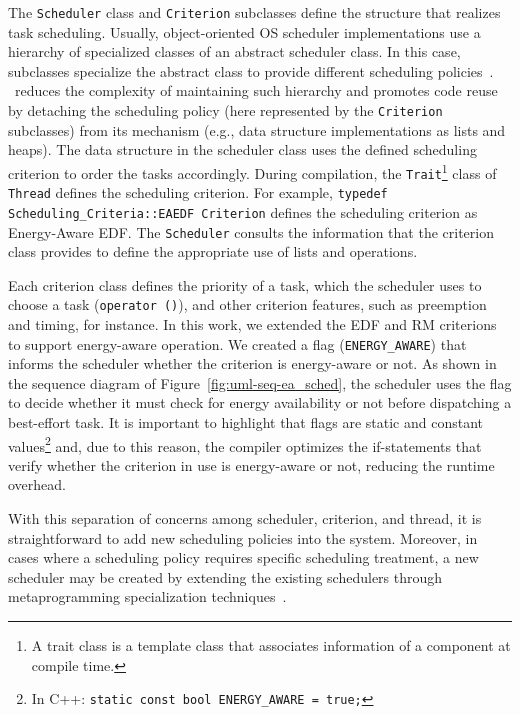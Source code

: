 
The \texttt{Scheduler} class and \texttt{Criterion} subclasses define the structure that realizes task scheduling.
Usually, object-oriented OS scheduler implementations use a hierarchy of specialized classes of an abstract scheduler class.
In this case, subclasses specialize the abstract class to provide different scheduling policies~\cite{Marcondes:EPS:2009}.
\epos~reduces the complexity of maintaining such hierarchy and promotes code reuse by detaching the scheduling policy (here represented by the \texttt{Criterion} subclasses) from its mechanism (e.g., data structure implementations as lists and heaps).
The data structure in the scheduler class uses the defined scheduling criterion to order the tasks accordingly.
During compilation, the \texttt{Trait}\footnote{A trait class is a template class that associates information of a component at compile time.} class of \texttt{Thread} defines the scheduling criterion.
For example, \texttt{typedef Scheduling\_Criteria::EAEDF Criterion} defines the scheduling criterion as Energy-Aware EDF.
The \texttt{Scheduler} consults the information that the criterion class provides to define the appropriate use of lists and operations.

Each criterion class defines the priority of a task, which the scheduler uses to choose a task (\texttt{operator ()}), and other criterion features, such as preemption and timing, for instance.
In this work, we extended the EDF and RM criterions to support energy-aware operation.
We created a flag (\texttt{ENERGY\_AWARE}) that informs the scheduler whether the criterion is energy-aware or not.
As shown in the sequence diagram of Figure~\ref{fig:uml-seq-ea_sched}, the scheduler uses the flag to decide whether it must check for energy availability or not before dispatching a best-effort task.
It is important to highlight that flags are static and constant values\footnote{In C++: \texttt{static const bool ENERGY\_AWARE = true;}} and, due to this reason, the compiler optimizes the if-statements that verify whether the criterion in use is energy-aware or not, reducing the runtime overhead.


With this separation of concerns among scheduler, criterion, and thread, it is straightforward to add new scheduling policies into the system.
Moreover, in cases where a scheduling policy requires specific scheduling treatment, a new scheduler may be created by extending the existing schedulers through metaprogramming specialization techniques~\cite{Czarnecki:2000}.

